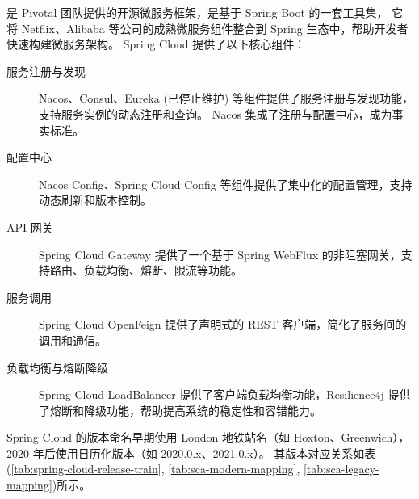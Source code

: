 是 Pivotal 团队提供的开源微服务框架，是基于 Spring Boot 的一套工具集，
它将 Netflix、Alibaba 等公司的成熟微服务组件整合到 Spring 生态中，帮助开发者快速构建微服务架构。
Spring Cloud 提供了以下核心组件：
\begin{description}
    \item[服务注册与发现] Nacos、Consul、Eureka (已停止维护) 等组件提供了服务注册与发现功能，支持服务实例的动态注册和查询。
        Nacos 集成了注册与配置中心，成为事实标准。
    \item[配置中心] Nacos Config、Spring Cloud Config 等组件提供了集中化的配置管理，支持动态刷新和版本控制。
    \item[API 网关] Spring Cloud Gateway 提供了一个基于 Spring WebFlux 的非阻塞网关，支持路由、负载均衡、熔断、限流等功能。
    \item[服务调用] Spring Cloud OpenFeign 提供了声明式的 REST 客户端，简化了服务间的调用和通信。
    \item[负载均衡与熔断降级] Spring Cloud LoadBalancer 提供了客户端负载均衡功能，Resilience4j 提供了熔断和降级功能，帮助提高系统的稳定性和容错能力。
\end{description}


Spring Cloud 的版本命名早期使用 London 地铁站名（如 Hoxton、Greenwich），2020 年后使用日历化版本（如 2020.0.x、2021.0.x）。
其版本对应关系如表(\ref{tab:spring-cloud-release-train}, \ref{tab:sca-modern-mapping}, \ref{tab:sca-legacy-mapping})所示。

